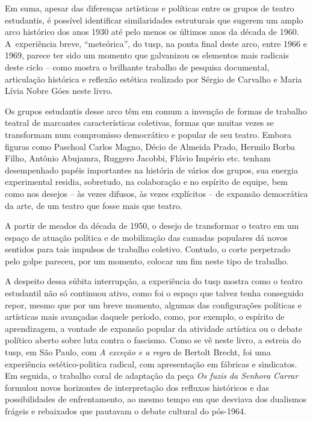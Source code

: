 \subject{Arco histórico}

Em suma, apesar das diferenças artísticas e políticas entre os grupos de
teatro estudantis, é possível identificar similaridades estruturais que
sugerem um amplo arco histórico dos anos 1930 até pelo menos os últimos
anos da década de 1960. A~experiência breve, “meteórica”, do {\sc tusp}, na
ponta final deste arco, entre 1966 e 1969, parece ter sido um momento
que galvanizou os elementos mais radicais deste ciclo -- como mostra o
brilhante trabalho de pesquisa documental, articulação histórica e
reflexão estética realizado por Sérgio de Carvalho e Maria Lívia Nobre
Góes neste livro.

Os grupos estudantis desse arco têm em comum a invenção de formas de
trabalho teatral de marcantes características coletivas, formas que
muitas vezes se transformam num compromisso democrático e popular de seu
teatro. Embora figuras como Paschoal Carlos Magno, Décio de Almeida
Prado, Hermilo Borba Filho, Antônio Abujamra, Ruggero Jacobbi, Flávio
Império etc. tenham desempenhado papéis importantes na história de
vários dos grupos, sua energia experimental residia, sobretudo, na
colaboração e no espírito de equipe, bem como nos desejos -- às vezes
difusos, às vezes explícitos -- de expansão democrática da arte, de um
teatro que fosse mais que teatro.

A partir de meados da década de 1950, o desejo de transformar o teatro
em um espaço de atuação política e de mobilização das camadas populares
dá novos sentidos para tais impulsos de trabalho coletivo. Contudo, o
corte perpetrado pelo golpe pareceu, por um momento, colocar um fim
neste tipo de trabalho.

A despeito dessa súbita interrupção, a experiência do {\sc tusp} mostra como o
teatro estudantil não só continuou ativo, como foi o espaço que talvez
tenha conseguido repor, mesmo que por um breve momento, algumas das
configurações políticas e artísticas mais avançadas daquele período,
como, por exemplo, o espírito de aprendizagem, a vontade de expansão
popular da atividade artística ou o debate político aberto sobre luta
contra o fascismo. Como se vê neste livro, a estreia do {\sc tusp}, em São
Paulo, com {\it A exceção e a regra} de Bertolt Brecht, foi uma
experiência estético-politica radical, com apresentação em fábricas e
sindicatos. Em seguida, o trabalho coral de adaptação da peça {\it Os
fuzis da Senhora Carrar} formulou novos horizontes de interpretação dos
refluxos históricos e das possibilidades de enfrentamento, ao mesmo
tempo em que desviava dos dualismos frágeis e rebaixados que pautavam o
debate cultural do pós-1964.


